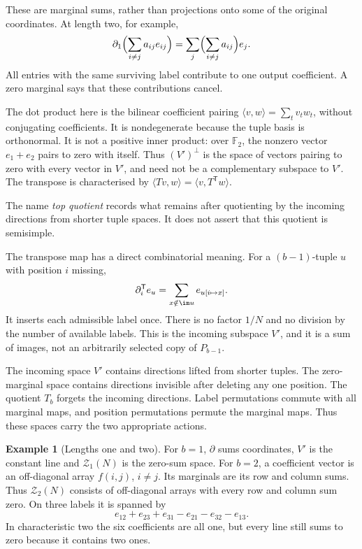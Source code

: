 \documentclass[11pt,a4paper,oneside,openany]{book}
\theoremstyle{definition}\newtheorem{definition}[theorem]{Definition}
\newtheorem{example}[theorem]{Example}
\theoremstyle{remark}\newtheorem{remark}[theorem]{Remark}
\numberwithin{equation}{chapter}
\begin{document}
These are marginal sums, rather than projections onto some of the
original coordinates. At length two, for example,
\[
 \partial_1\Bigl(\sum_{i\ne j}a_{ij}e_{ij}\Bigr)
                  =\sum_j\Bigl(\sum_{i\ne j}a_{ij}\Bigr)e_j.
\]
All entries with the same surviving label contribute to one output
coefficient. A zero marginal says that these contributions cancel.

The dot product here is the bilinear coefficient pairing
$\langle v,w\rangle=\sum_t v_t w_t$, without conjugating coefficients.
It is nondegenerate because the tuple basis is orthonormal. It is not
a positive inner product: over $\mathbb F_2$, the nonzero vector
$e_1+e_2$ pairs to zero with itself. Thus $(V')^\perp$ is the space
of vectors pairing to zero with every vector in $V'$, and need not
be a complementary subspace to $V'$. The transpose is characterised
by $\langle Tv,w\rangle=\langle v,T^{\mathsf T}w\rangle$.

The name \emph{top quotient} records what remains after quotienting
by the incoming directions from shorter tuple spaces. It does not
assert that this quotient is semisimple.

The transpose map has a direct combinatorial meaning. For a
$(b-1)$-tuple $u$ with position $i$ missing,
\[
 \partial_i^{\mathsf T}e_u
       =\sum_{x\notin\im u} e_{u[i\mapsto x]}.
\]
It inserts each admissible label once. There is no factor $1/N$ and
no division by the number of available labels. This is the incoming
subspace $V'$, and it is a sum of images, not an arbitrarily selected
copy of $P_{b-1}$.

The incoming space $V'$ contains directions lifted from shorter tuples. The zero-marginal space contains directions invisible after deleting any one position. The quotient $T_b$ forgets the incoming directions. Label permutations commute with all marginal maps, and position permutations permute the marginal maps. Thus these spaces carry the two appropriate actions.

\begin{example}[Lengths one and two]
For $b=1$, $\partial$ sums coordinates, $V'$ is the constant line and $\mathcal Z_1(N)$ is the zero-sum space. For $b=2$, a coefficient vector is an off-diagonal array $f(i,j)$, $i\ne j$. Its marginals are its row and column sums. Thus $\mathcal Z_2(N)$ consists of off-diagonal arrays with every row and column sum zero. On three labels it is spanned by
\[e_{12}+e_{23}+e_{31}-e_{21}-e_{32}-e_{13}.
\]
In characteristic two the six coefficients are all one, but every line still sums to zero because it contains two ones.
\end{example}
\end{document}
